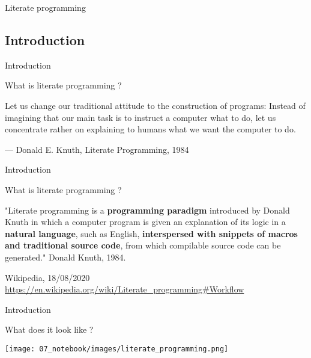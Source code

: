 \begin{frame}%

\huge{Literate programming}

\end{frame}

\subsection{Introduction}

\begin{frame}{Introduction}

What is literate programming ?

    Let us change our traditional attitude to the construction of programs: Instead of imagining that our main task is to instruct a computer what to do, let us concentrate rather on explaining to humans what we want the computer to do.

    — Donald E. Knuth, Literate Programming, 1984
\end{frame}

\begin{frame}{Introduction}

What is literate programming ?

\begin{definition}
"Literate programming is a \textbf{programming paradigm} introduced by Donald Knuth in which a computer program is given an explanation of its logic in a \textbf{natural language}, such as English, \textbf{interspersed with snippets of macros and traditional source code}, from which compilable source code can be generated." Donald Knuth, 1984.
\end{definition}

Wikipedia, 18/08/2020 \url{https://en.wikipedia.org/wiki/Literate\_programming\#Workflow}
\end{frame}


\begin{frame}{Introduction}

What does it look like ?

\centering\texttt{[image: 07\_notebook/images/literate\_programming.png]}

\end{frame}

